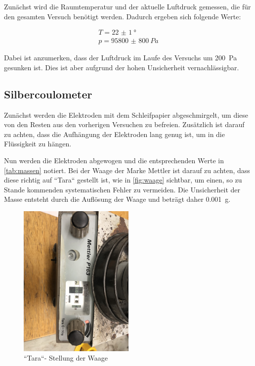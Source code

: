 \documentclass[11pt,ngerman]{scrartcl}
\begin{document}
Zunächst wird die Raumtemperatur und der aktuelle Luftdruck gemessen, die für den gesamten Versuch benötigt werden. Dadurch ergeben sich folgende Werte:

\begin{align*}
	T = \SI{22(1)}{\degree} \\
	p = \SI{95800(800)}{Pa}
\end{align*}

Dabei ist anzumerken, dass der Luftdruck im Laufe des Versuchs um \SI{200}{Pa} gesunken ist. Dies ist aber aufgrund der hohen Unsicherheit vernachlässigbar.

\subsection{Silbercoulometer}

Zunächst werden die Elektroden mit dem Schleifpapier abgeschmirgelt, um diese von den Resten aus den vorherigen Versuchen zu befreien. Zusätzlich ist darauf zu achten, dass die Aufhängung der Elektroden lang genug ist, um in die Flüssigkeit zu hängen.

\vspace{2mm}

Nun werden die Elektroden abgewogen und die entsprechenden Werte in \autoref{tab:massen} notiert. Bei der Waage der Marke Mettler ist darauf zu achten, dass diese richtig auf ``Tara`` gestellt ist, wie in \autoref{fig:waage} sichtbar, um einen, so zu Stande kommenden systematischen Fehler zu vermeiden. Die Unsicherheit der Masse entsteht durch die Auflösung der Waage und beträgt daher \SI{0.001}{\g}.

\begin{figure}[H]
	\begin{center}
		\includegraphics[width=0.5\textwidth]{waage}
	\end{center}
	\caption{``Tara``- Stellung der Waage}
	\label{fig:waage}
\end{figure}
\end{document}
